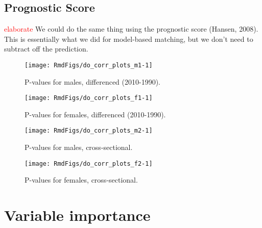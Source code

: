 \documentclass[11pt]{article}\usepackage[]{graphicx}\usepackage[]{color}
\makeatletter
\def\maxwidth{ %
  \ifdim\Gin@nat@width>\linewidth
    \linewidth
  \else
    \Gin@nat@width
  \fi
}
\newenvironment{knitrout}{}{} %
\makeatother
\begin{document}
\subsection{Prognostic Score}
\textcolor{red}{elaborate}
We could do the same thing using the prognostic score (Hansen, 2008).
This is essentially what we did for model-based matching, but we don't need to subtract off the prediction.



\begin{knitrout}
\color{fgcolor}\begin{figure}
\texttt{[image: RmdFigs/do\_corr\_plots\_m1-1]} \caption[P-values for males, differenced (2010-1990)]{P-values for males, differenced (2010-1990).}\label{fig:do_corr_plots_m1}
\end{figure}


\end{knitrout}
\begin{knitrout}
\color{fgcolor}\begin{figure}
\texttt{[image: RmdFigs/do\_corr\_plots\_f1-1]} \caption[P-values for females, differenced (2010-1990)]{P-values for females, differenced (2010-1990).}\label{fig:do_corr_plots_f1}
\end{figure}


\end{knitrout}
\begin{knitrout}
\color{fgcolor}\begin{figure}
\texttt{[image: RmdFigs/do\_corr\_plots\_m2-1]} \caption[P-values for males, cross-sectional]{P-values for males, cross-sectional.}\label{fig:do_corr_plots_m2}
\end{figure}


\end{knitrout}
\begin{knitrout}
\color{fgcolor}\begin{figure}
\texttt{[image: RmdFigs/do\_corr\_plots\_f2-1]} \caption[P-values for females, cross-sectional]{P-values for females, cross-sectional.}\label{fig:do_corr_plots_f2}
\end{figure}


\end{knitrout}

\newpage
\section{Variable importance}
\end{document}
